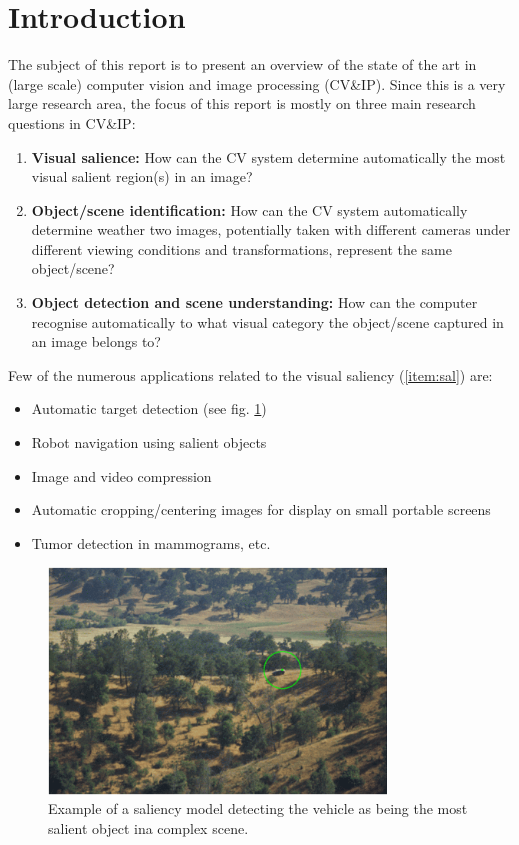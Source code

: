 \section{Introduction}
\label{sec:intro}

The subject of this report is to present an overview of the state of the art in (large scale) computer vision and image processing (CV\&IP). 
Since this is a very large research area, the focus of this report is mostly on three main research questions in CV\&IP:
\begin{enumerate}
\item {\bf Visual salience:} How can the CV system determine automatically the most visual salient region(s) in an image?\label{item:sal}
\item {\bf Object/scene identification:} How can the CV system automatically determine weather two images, potentially taken with different cameras under different viewing conditions and transformations, represent the same object/scene?\label{item:ident}
\item {\bf Object detection and scene understanding:} How can the computer recognise automatically to what visual category the object/scene captured in an image belongs to? \label{item:und}
\end{enumerate}

Few of the numerous applications related to the visual saliency (\ref{item:sal}) are:
\begin{itemize}
\item Automatic target detection (see fig. \ref{fig:sal})
\item Robot navigation using salient objects
\item Image and video compression
\item Automatic cropping/centering images for display on small portable screens
\item Tumor detection in mammograms, etc.
\end{itemize}

\begin{figure}[H]
\begin{center}
\includegraphics[width=0.8\textwidth]{fig/saliency}
\end{center}
\caption{Example of a saliency model detecting the vehicle as being the most salient object ina complex scene.}
\label{fig:sal}
\end{figure}

